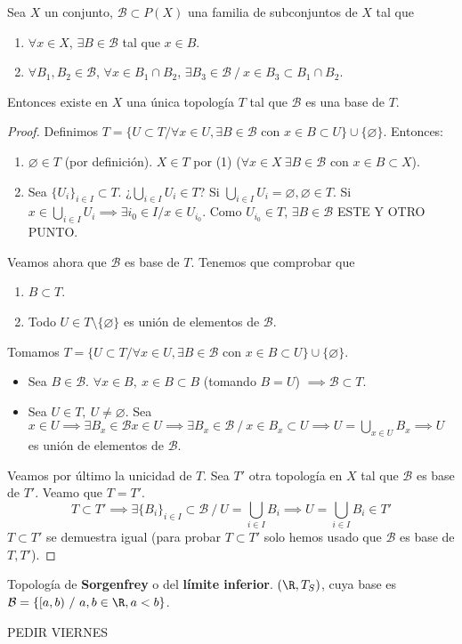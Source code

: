 \begin{nth}
  Sea $X$ un conjunto, $\mathcal{B} \subset P(X)$ una familia de subconjuntos de $X$ tal que
  \begin{enumerate}
    \item $\forall x \in X$, $\exists B \in \mathcal{B}$ tal que $x \in B$.
    \item $\forall B_1,B_2 \in \mathcal{B}$, $\forall x \in B_1 \cap B_2$, $\exists B_3 \in \mathcal{B}\ /\ x \in B_3 \subset B_1 \cap B_2$.
  \end{enumerate}
  Entonces existe en $X$ una única topología $T$ tal que $\mathcal{B}$ es una base de $T$.
\end{nth}
\begin{proof}
  Definimos $T=\{U \subset T / \forall x \in U, \exists B \in \mathcal{B}$ con $ x \in B \subset U\} \cup \{\varnothing \}$. Entonces:
  \begin{enumerate}
    \item $\varnothing \in T$ (por definición). $X \in T$ por (1) ($\forall x \in X\ \exists B \in \mathcal{B}$ con $x \in B \subset X$).
    \item Sea $\{U_i\}_{i \in I} \subset T$. ¿$\bigcup_{i \in I} U_i \in T$? Si $\bigcup_{i \in I} U_i = \varnothing , \varnothing \in T$. Si $x \in \bigcup_{i \in I} U_i \implies \exists i_0 \in I / x \in U_{i_0}$. Como $U_{i_0} \in T$, $\exists B \in \mathcal{B}$ ESTE Y OTRO PUNTO.
  \end{enumerate}
  Veamos ahora que $\mathcal{B}$ es base de $T$. Tenemos que comprobar que
  \begin{enumerate}
    \item $B \subset T$.
    \item Todo $U \in T \setminus \{\varnothing \}$ es unión de elementos de $\mathcal{B}$.
  \end{enumerate}
  Tomamos $T=\{U \subset T / \forall x \in U, \exists B \in \mathcal{B}$ con $ x \in B \subset U\} \cup \{\varnothing \}$.
  \begin{itemize}
    \item Sea $B \in \mathcal{B}$. $\forall x \in B,\ x \in B \subset B$ (tomando $B=U$) $\implies \mathcal{B} \subset T$.
    \item Sea $U \in T,\ U \neq \varnothing $. Sea $x \in U \implies \exists B_x \in \mathcal{B}x \in U \implies \exists B_x \in \mathcal{B}\ /\ x \in B_x \subset U \implies U = \bigcup_{x \in U} B_x \implies U$ es unión de elementos de $\mathcal{B}$.
  \end{itemize}
  Veamos por último la unicidad de $T$. Sea $T'$ otra topología en $X$ tal que $\mathcal{B}$ es base de $T'$. Veamo que $T=T'$. \[T \subset T' \implies \exists \{B_i\}_{i \in I} \subset \mathcal{B}\ /\ U = \bigcup_{i \in I} B_i \implies U = \bigcup_{i \in I} B_i \in T' \]
  $T \subset T'$ se demuestra igual (para probar $T \subset T'$ solo hemos usado que $\mathcal{B}$ es base de $T,T'$).
\end{proof}
\begin{exmp}
  Topología de \textbf{Sorgenfrey} o del \textbf{límite inferior}. $(\R,T_S)$, cuya base es $\mathcal{B}=\{[a,b)\ /\ a,b \in \R, a<b\} $.
\end{exmp}
PEDIR VIERNES

